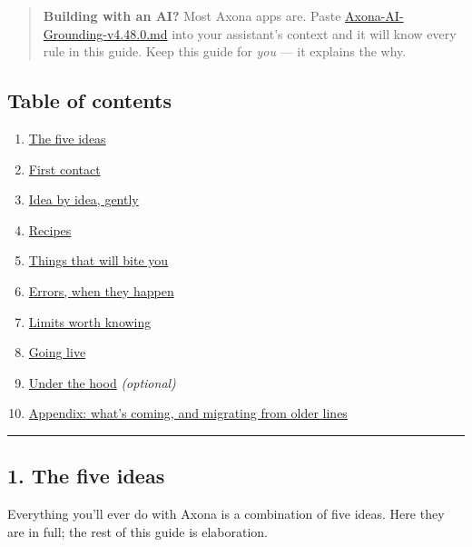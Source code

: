 \documentclass[
  nobib]{tufte-handout}
\providecommand{\tightlist}{%
  \setlength{\itemsep}{0pt}\setlength{\parskip}{0pt}}
\begin{document}
\begin{quote}
\textbf{Building with an AI?} Most Axona apps are. Paste
\url{Axona-AI-Grounding-v4.48.0.md} into your assistant's context and it
will know every rule in this guide. Keep this guide for \emph{you} ---
it explains the why.
\end{quote}

\subsection{Table of contents}\label{table-of-contents}

\begin{enumerate}
\def\labelenumi{\arabic{enumi}.}
\tightlist
\item
  \hyperref[1-the-five-ideas]{The five ideas}
\item
  \hyperref[2-first-contact]{First contact}
\item
  \hyperref[3-idea-by-idea-gently]{Idea by idea, gently}
\item
  \hyperref[4-recipes]{Recipes}
\item
  \hyperref[5-things-that-will-bite-you]{Things that will bite you}
\item
  \hyperref[6-errors-when-they-happen]{Errors, when they happen}
\item
  \hyperref[7-limits-worth-knowing]{Limits worth knowing}
\item
  \hyperref[8-going-live]{Going live}
\item
  \hyperref[9-under-the-hood--optional]{Under the hood}
  \emph{(optional)}
\item
  \hyperref[10-appendix]{Appendix: what's coming, and migrating from
  older lines}
\end{enumerate}

\begin{center}\rule{0.5\linewidth}{0.5pt}\end{center}

\subsection{1. The five ideas}\label{the-five-ideas}

Everything you'll ever do with Axona is a combination of five ideas.
Here they are in full; the rest of this guide is elaboration.
\end{document}
